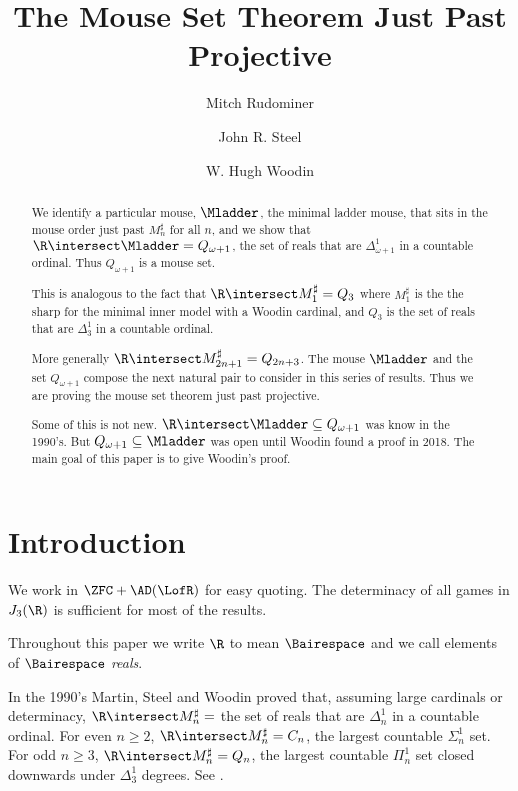 \documentclass[oneside,12pt]{amsart}
\begin{document}
\title{The Mouse Set Theorem Just Past Projective}
\author{Mitch Rudominer}
\author{John R. Steel}
\author{W. Hugh Woodin}



\begin{abstract}
We identify a particular mouse, $\Mladder$, the minimal ladder mouse,
that sits in the mouse order just past $M_n^{\sharp}$ for all $n$,
 and we show that $\R\intersect \Mladder = Q_{\omega+1}$,
 the set of reals that are
$\Delta^1_{\omega+1}$ in a countable ordinal. Thus $Q_{\omega+1}$
is a mouse set.

This is analogous to the fact that $\R\intersect M^{\sharp}_1 = Q_3$ where $M^{\sharp}_1$ is the
the sharp for the minimal inner model with a Woodin cardinal, and $Q_3$ is the set of reals
that are $\Delta^1_3$ in a countable ordinal.

More generally $\R\intersect M^{\sharp}_{2n+1} = Q_{2n+3}$.
The mouse $\Mladder$ and the set $Q_{\omega+1}$  compose the next natural
pair to consider in this series of results. Thus we are proving the mouse
set theorem just past projective.

Some of this is not new. $\R\intersect \Mladder \subseteq Q_{\omega+1}$ was
know in the 1990's. But $Q_{\omega+1} \subseteq \Mladder$ was open
until Woodin found a proof in 2018. The main goal of this paper is to give
Woodin's proof.
\end{abstract}

\maketitle

\tableofcontents

\section{Introduction}
\label{section:intro}

We work in $\ZFC+\AD(\LofR)$ for easy quoting. The determinacy of all games
in $J_3(\R)$ is sufficient for most of the results.

Throughout this paper we write $\R$ to mean $\Bairespace$ and we call elements of $\Bairespace$ \emph{reals}.

In the 1990's Martin, Steel and Woodin proved that, assuming large cardinals or determinacy,
$\R\intersect M_n^{\sharp} = $ the set of reals that are $\Delta^1_n$ in a countable ordinal.
For even $n\geq 2$, $\R\intersect M_n^{\sharp} = C_n$, the largest countable $\Sigma^1_n$ set.
For odd $n\geq 3$, $\R\intersect M_n^{\sharp} = Q_n$, the largest countable $\Pi^1_n$
set closed downwards under $\Delta^1_3$ degrees. See \cite{Proj_WO_In_Mod}.
\end{document}

